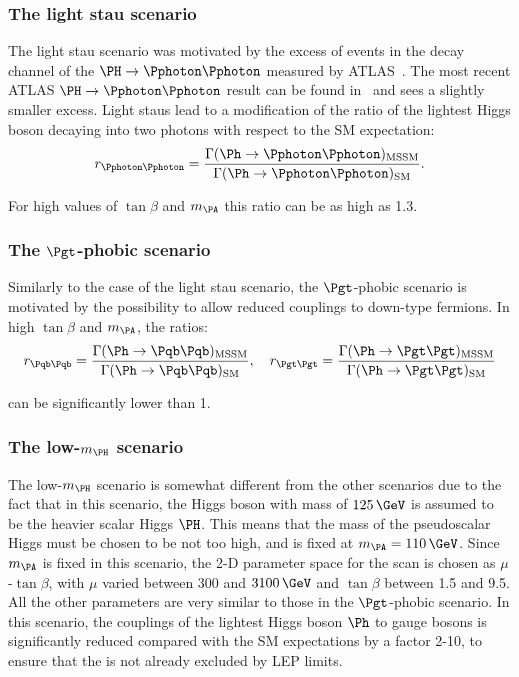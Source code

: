 \subsubsection{The light stau scenario}
\label{sec:lightstauscenario}

The light stau scenario was motivated by the excess of events in the decay
channel of the $\PH\to\Pphoton\Pphoton$ measured by
ATLAS~\cite{ATLAS-CONF-2013-012}. The most recent ATLAS $\PH\to\Pphoton\Pphoton$
result can be found in~\cite{Aad:2014eha} and sees a slightly smaller excess.
Light staus lead to a modification of the ratio of the lightest Higgs boson decaying into
two photons with respect to the \ac{SM} expectation:
\begin{equation}
r_{\Pphoton\Pphoton} =
\frac{\Gamma(\Ph\to\Pphoton\Pphoton)_{\text{MSSM}}}{\Gamma(\Ph\to\Pphoton\Pphoton)_{\text{SM}}}
.
\end{equation}

For high values of $\tan\beta$ and $m_{\PA}$ this ratio can be as high as 1.3. 

\subsubsection{The $\Pgt$-phobic scenario}
\label{sec:tauphobicscenario}

Similarly to the case of the light stau scenario, the $\Pgt$-phobic scenario is
motivated by the possibility to allow reduced couplings to down-type fermions.
In high $\tan\beta$ and $m_{\PA}$, the ratios:
\begin{equation}
r_{\Pqb\Pqb} =
\frac{\Gamma(\Ph\to\Pqb\Pqb)_{\text{MSSM}}}{\Gamma(\Ph\to\Pqb\Pqb)_{\text{SM}}}
, \quad
r_{\Pgt\Pgt} =
\frac{\Gamma(\Ph\to\Pgt\Pgt)_{\text{MSSM}}}{\Gamma(\Ph\to\Pgt\Pgt)_{\text{SM}}}
\end{equation}

can be significantly lower than 1.

\subsubsection{The low-$m_{\PH}$ scenario}
\label{sec:lowmHscenario}

The low-$m_{\PH}$ scenario is somewhat different from the other scenarios due to
the fact that in this scenario, the Higgs boson with mass of $125\,\GeV$ is
assumed to be the heavier scalar Higgs $\PH$. This means that the mass of the
pseudoscalar Higgs must be chosen to be not too high, and is fixed at $m_{\PA} =
110\,\GeV$. Since $m_{\PA}$ is fixed in this scenario, the 2-D parameter space
for the scan is chosen as $\mu$-$\tan\beta$, with $\mu$ varied between 300 and
$3100\,\GeV$ and $\tan\beta$ between 1.5 and 9.5. All the other parameters are
very similar to those in the $\Pgt$-phobic scenario. In this scenario, the
couplings of the lightest Higgs boson $\Ph$ to gauge bosons is significantly
reduced compared with the \ac{SM} expectations by a factor 2-10, to ensure that
the \Ph is not already excluded by LEP limits. 

